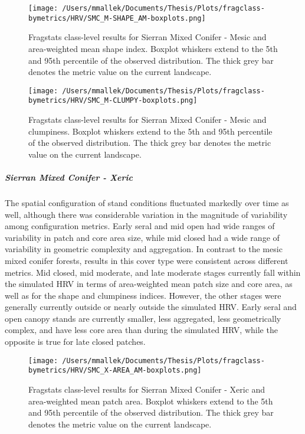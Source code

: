 \begin{figure}[!htbp]
\centering
    \texttt{[image: /Users/mmallek/Documents/Thesis/Plots/fragclass-bymetrics/HRV/SMC\_M-SHAPE\_AM-boxplots.png]}
  \caption{Fragstats class-level results for Sierran Mixed Conifer - Mesic and area-weighted mean shape index. Boxplot whiskers extend to the 5th and 95th percentile of the observed distribution. The thick grey bar denotes the metric value on the current landscape.}
  \label{fig:smcm_shapeam}
\end{figure}


\begin{figure}[!htbp]
\centering
    \texttt{[image: /Users/mmallek/Documents/Thesis/Plots/fragclass-bymetrics/HRV/SMC\_M-CLUMPY-boxplots.png]}
  \caption{Fragstats class-level results for Sierran Mixed Conifer - Mesic and clumpiness. Boxplot whiskers extend to the 5th and 95th percentile of the observed distribution. The thick grey bar denotes the metric value on the current landscape.}
  \label{fig:smcm_clumpy}
\end{figure}

\clearpage


\subparagraph{Sierran Mixed Conifer - Xeric}
The spatial configuration of stand conditions fluctuated markedly over time as well, although there was considerable variation in the magnitude of variability among configuration metrics. Early seral and mid open had wide ranges of variability in patch and core area size, while mid closed had a wide range of variability in geometric complexity and aggregation. In contrast to the mesic mixed conifer forests, results in this cover type were consistent across different metrics. Mid closed, mid moderate, and late moderate stages currently fall within the simulated HRV in terms of area-weighted mean patch size and core area, as well as for the shape and clumpiness indices. However, the other stages were generally currently outside or nearly outside the simulated HRV. Early seral and open canopy stands are currently smaller, less aggregated, less geometrically complex, and have less core area than during the simulated HRV, while the opposite is true for late closed patches.


\begin{figure}[!htbp]
\centering
    \texttt{[image: /Users/mmallek/Documents/Thesis/Plots/fragclass-bymetrics/HRV/SMC\_X-AREA\_AM-boxplots.png]}
  \caption{Fragstats class-level results for Sierran Mixed Conifer - Xeric and area-weighted mean patch area. Boxplot whiskers extend to the 5th and 95th percentile of the observed distribution. The thick grey bar denotes the metric value on the current landscape.}
  \label{fig:smcx_areaam}
\end{figure}


